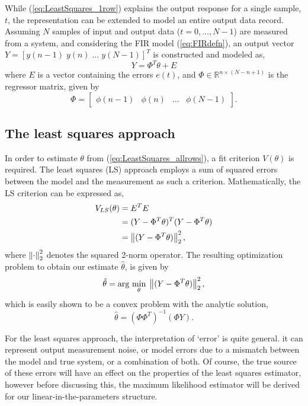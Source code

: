 While (\ref{eq:LeastSquares_1row}) explains the output response for a single sample, $t$, the representation can be extended to model an entire output data record. Assuming $N$ samples of input and output data ($t = 0, \hdots, N-1$) are measured from a system, and considering the FIR model (\ref{eq:FIRdefn}), an output vector $Y = [y(n-1) \; y(n) \; \hdots \; y(N-1)]^T$ is constructed and modeled as,
\begin{equation}
\label{eq:LeastSquares_allrows}
Y =  \Phi^T \theta + E
\end{equation}
where $E$ is a vector containing the errors $e(t)$, and $\Phi \in \mathbb{R}^{n \times (N-n+1)}$ is the regressor matrix, given by
\begin{equation}
\Phi = \begin{bmatrix} \phi(n-1) &\phi(n) &\hdots &\phi(N-1) \end{bmatrix}.
\end{equation}

\subsection{The least squares approach}

In order to estimate $\theta$ from (\ref{eq:LeastSquares_allrows}), a fit criterion $V(\theta)$ is required. The least squares (LS) approach employs a sum of squared errors between the model and the measurement as such a criterion. Mathematically, the LS criterion can be expressed as,
\begin{align}
V_{LS}(\theta) &= E^T E \\ 
&= (Y-\Phi^T \theta)^T(Y - \Phi^T \theta) \\
&= \left\lVert(Y-\Phi^T \theta)\right\rVert_2^2,
\label{eq:LS_criterion}
\end{align}
where $\left\lVert\cdot\right\rVert_2^2$ denotes the squared 2-norm operator. The resulting optimization problem to obtain our estimate $\hat{\theta}$, is given by
\begin{equation}
\hat{\theta} = \text{arg } \underset{\theta}{\text{min}} \; \left\lVert(Y-\Phi^T \theta)\right\rVert_2^2,
\label{eq:LS_opt}
\end{equation}
which is easily shown to be a convex problem with the analytic solution,
\begin{equation}
\hat{\theta} = (\Phi \Phi^T)^{-1}(\Phi Y).
\label{eq:LS_analytic}
\end{equation}

For the least squares approach, the interpretation of `error' is quite general. it can represent output measurement noise, or model errors due to a mismatch between the model and true system, or a combination of both. Of course, the true source of these errors will have an effect on the properties of the least squares estimator, however before discussing this, the maximum likelihood estimator will be derived for our linear-in-the-parameters structure.

